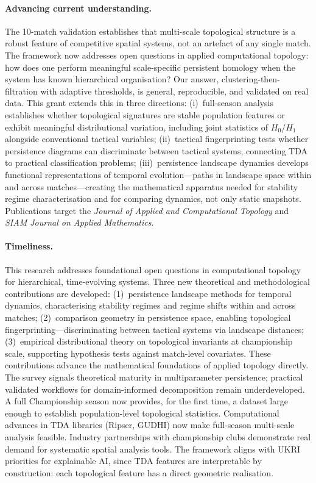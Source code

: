 \paragraph{Advancing current understanding.}
The 10-match validation establishes that multi-scale topological structure is a robust feature of competitive spatial systems, not an artefact of any single match. The framework now addresses open questions in applied computational topology: how does one perform meaningful scale-specific persistent homology when the system has known hierarchical organisation? Our answer, clustering-then-filtration with adaptive thresholds, is general, reproducible, and validated on real data. This grant extends this in three directions: (i)~full-season analysis establishes whether topological signatures are stable population features or exhibit meaningful distributional variation, including joint statistics of $H_0$/$H_1$ alongside conventional tactical variables; (ii)~tactical fingerprinting tests whether persistence diagrams can discriminate between tactical systems, connecting TDA to practical classification problems; (iii)~persistence landscape dynamics develops functional representations of temporal evolution---paths in landscape space within and across matches---creating the mathematical apparatus needed for stability regime characterisation and for comparing dynamics, not only static snapshots. Publications target the \emph{Journal of Applied and Computational Topology} and \emph{SIAM Journal on Applied Mathematics}.

\paragraph{Timeliness.}
This research addresses foundational open questions in computational topology for hierarchical, time-evolving systems. Three new theoretical and methodological contributions are developed: (1)~persistence landscape methods for temporal dynamics, characterising stability regimes and regime shifts within and across matches; (2)~comparison geometry in persistence space, enabling topological fingerprinting---discriminating between tactical systems via landscape distances; (3)~empirical distributional theory on topological invariants at championship scale, supporting hypothesis tests against match-level covariates. These contributions advance the mathematical foundations of applied topology directly. The \citet{BotnanLesnick2022} survey signals theoretical maturity in multiparameter persistence; practical validated workflows for domain-informed decomposition remain underdeveloped. A full Championship season now provides, for the first time, a dataset large enough to establish population-level topological statistics. Computational advances in TDA libraries (Ripser, GUDHI) now make full-season multi-scale analysis feasible. Industry partnerships with championship clubs demonstrate real demand for systematic spatial analysis tools. The framework aligns with UKRI priorities for explainable AI, since TDA features are interpretable by construction: each topological feature has a direct geometric realisation.

